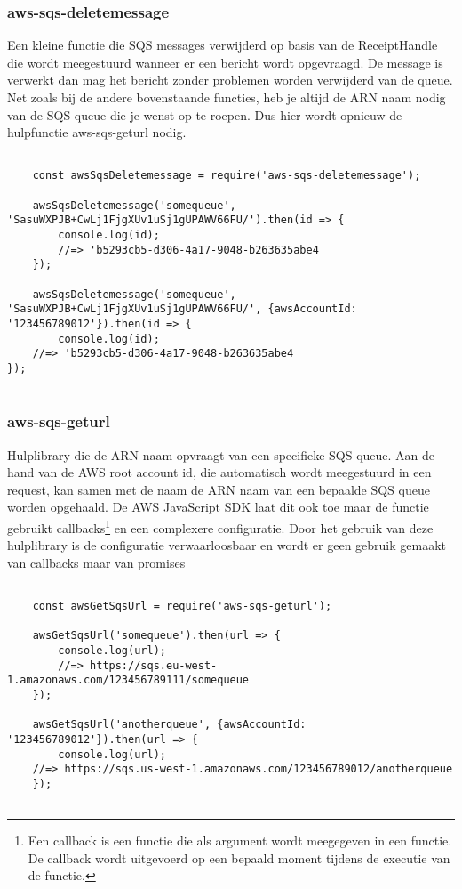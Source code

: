 \subsubsection{aws-sqs-deletemessage}
Een kleine functie die SQS messages verwijderd op basis van de ReceiptHandle die wordt meegestuurd wanneer er een bericht wordt opgevraagd. De message is verwerkt dan mag het bericht zonder problemen worden verwijderd van de queue. Net zoals bij de andere bovenstaande functies, heb je altijd de ARN naam nodig van de SQS queue die je wenst op te roepen. Dus hier wordt opnieuw de hulpfunctie aws-sqs-geturl nodig.

\begin{lstlisting}[caption=Voorbeeld hoe een bericht wordt verwijderd van SQS nadat het is verwerkt]

	const awsSqsDeletemessage = require('aws-sqs-deletemessage');

	awsSqsDeletemessage('somequeue', 'SasuWXPJB+CwLj1FjgXUv1uSj1gUPAWV66FU/').then(id => {
		console.log(id);
		//=> 'b5293cb5-d306-4a17-9048-b263635abe4
	});

	awsSqsDeletemessage('somequeue', 'SasuWXPJB+CwLj1FjgXUv1uSj1gUPAWV66FU/', {awsAccountId: '123456789012'}).then(id => {
		console.log(id);
	//=> 'b5293cb5-d306-4a17-9048-b263635abe4
});
	
\end{lstlisting}

\subsubsection{aws-sqs-geturl}
Hulplibrary die de ARN naam opvraagt van een specifieke SQS queue. Aan de hand van de AWS root account id, die automatisch wordt meegestuurd in een request, kan samen met de naam de ARN naam van een bepaalde SQS queue worden opgehaald. De AWS JavaScript SDK laat dit ook toe maar de functie gebruikt callbacks\footnote{Een callback is een functie die als argument wordt meegegeven in een functie. De callback wordt uitgevoerd op een bepaald moment tijdens de executie van de functie.}  en een complexere configuratie. Door het gebruik van deze hulplibrary is de configuratie verwaarloosbaar en wordt er geen gebruik gemaakt van callbacks maar van promises

\begin{lstlisting}[caption=Voorbeeld hoe de ARN van een SQS wordt opgehaald]

	const awsGetSqsUrl = require('aws-sqs-geturl');

	awsGetSqsUrl('somequeue').then(url => {
		console.log(url);
		//=> https://sqs.eu-west-1.amazonaws.com/123456789111/somequeue
	});

	awsGetSqsUrl('anotherqueue', {awsAccountId: '123456789012'}).then(url => {
		console.log(url);
	//=> https://sqs.us-west-1.amazonaws.com/123456789012/anotherqueue
	});
	
\end{lstlisting}

